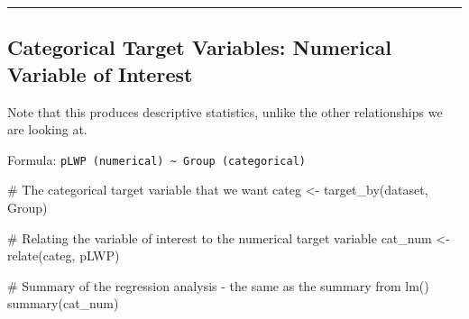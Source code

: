 \documentclass[
  letterpaper,
  DIV=11,
  numbers=noendperiod]{scrreprt}
\newenvironment{Shaded}{\begin{snugshade}}{\end{snugshade}}
\newcommand{\CommentTok}[1]{\textcolor[rgb]{0.37,0.37,0.37}{#1}}
\newcommand{\FunctionTok}[1]{\textcolor[rgb]{0.28,0.35,0.67}{#1}}
\newcommand{\NormalTok}[1]{\textcolor[rgb]{0.00,0.23,0.31}{#1}}
\newcommand{\OtherTok}[1]{\textcolor[rgb]{0.00,0.23,0.31}{#1}}
\begin{document}
\begin{center}\rule{0.5\linewidth}{0.5pt}\end{center}

\hypertarget{categorical-target-variables-numerical-variable-of-interest}{%
\subsection{Categorical Target Variables: Numerical Variable of
Interest}\label{categorical-target-variables-numerical-variable-of-interest}}

Note that this produces descriptive statistics, unlike the other
relationships we are looking at.

Formula:
\texttt{pLWP\ (numerical)\ \textasciitilde{}\ Group\ (categorical)}

\begin{Shaded}
\begin{Highlighting}[]
\CommentTok{\# The categorical target variable that we want}
\NormalTok{categ }\OtherTok{\textless{}{-}} \FunctionTok{target\_by}\NormalTok{(dataset, Group)}

\CommentTok{\# Relating the variable of interest to the numerical target variable}
\NormalTok{cat\_num }\OtherTok{\textless{}{-}} \FunctionTok{relate}\NormalTok{(categ, pLWP)}

\CommentTok{\# Summary of the regression analysis {-} the same as the summary from lm()}
\FunctionTok{summary}\NormalTok{(cat\_num)}
\end{Highlighting}
\end{Shaded}
\end{document}
